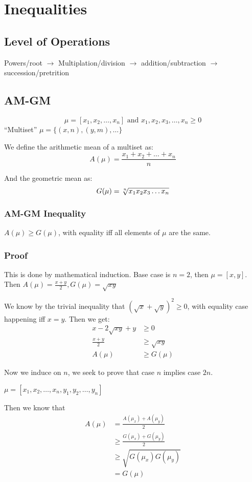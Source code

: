\documentclass[11 pt, twoside]{article}
\begin{document}
\section{Inequalities}

\subsection{Level of Operations}
Powers/root $\to$ Multiplation/division $\to$ addition/subtraction $\to$
succession/pretrition
\subsection{AM-GM}

$$\mu = [x_1, x_2, \dots, x_n] \text{ and } x_1, x_2, x_3, \dots, x_n \geq 0$$
``Multiset'' $\mu = \{(x, n), (y, m), \dots\}$

We define the arithmetic mean of a multiset as:
$$A(\mu) = \frac{x_1 + x_2 + \dots + x_n}{n}$$

And the geometric mean as:
$$G(\mu) = \sqrt[\uproot{2}n]{x_1x_2x_3\dots x_n}$$

\subsubsection{AM-GM Inequality}
$A(\mu) \geq G(\mu)$, with equality iff all elements
of $\mu$ are the same.

\subsubsection{Proof}
This is done by mathematical induction. Base case is $n = 2$, then $\mu = [x,
y]$. Then $A(\mu) = \frac{x + y}{2}, G(\mu) = \sqrt{xy}$

We know by the trivial inequality that $(\sqrt{x} + \sqrt{y})^2 \geq 0$, with
equality case happening iff $x = y$. Then we get:
\begin{align*}
x - 2 \sqrt{xy} + y &\geq 0\\
\frac{x + y}{2} &\geq \sqrt{xy}\\
A(\mu) &\geq G(\mu)
\end{align*}

Now we induce on $n$, we seek to prove that case $n$ implies case $2n$.

$\mu = [x_1, x_2, \dots, x_n, y_1, y_2, \dots, y_n]$

Then we know that
\begin{align*}
A(\mu) &= \frac{A(\mu_x) + A(\mu_y)}{2}\\
&\geq \frac{G(\mu_x) + G(\mu_y)}{2}\\
&\geq \sqrt{G(\mu_x)G(\mu_y)}\\
&= G(\mu)
\end{align*}
\end{document}
